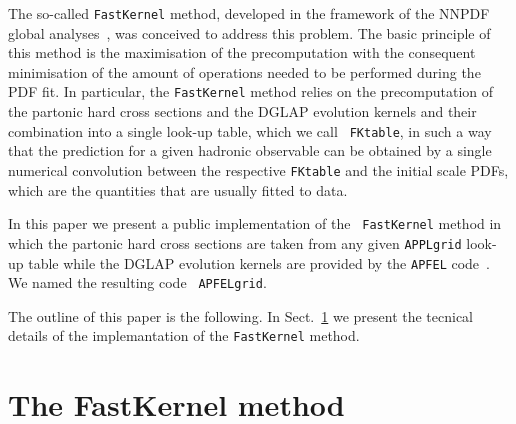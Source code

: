 \documentclass[preprint,12pt]{elsarticle}
\begin{document}
The so-called {\tt FastKernel} method, developed in the framework of
the NNPDF global analyses~\cite{Ball:2010de}, was conceived to address
this problem. The basic principle of this method is the maximisation
of the precomputation with the consequent minimisation of the amount
of operations needed to be performed during the PDF fit. In
particular, the {\tt FastKernel} method relies on the precomputation
of the partonic hard cross sections and the DGLAP evolution kernels
and their combination into a single look-up table, which we call {\tt
  FKtable}, in such a way that the prediction for a given hadronic
observable can be obtained by a single numerical convolution between
the respective {\tt FKtable} and the initial scale PDFs, which are
the quantities that are usually fitted to data.

In this paper we present a public implementation of the {\tt
  FastKernel} method in which the partonic hard cross sections are
taken from any given {\tt APPLgrid} look-up table while the DGLAP
evolution kernels are provided by the {\tt APFEL}
code~\cite{Bertone:2013vaa}. We named the resulting code {\tt
  APFELgrid}.

The outline of this paper is the following. In
Sect.~\ref{sec:FastKernel} we present the tecnical details of the
implemantation of the {\tt FastKernel} method.

\section{The FastKernel method}\label{sec:FastKernel}
\end{document}
